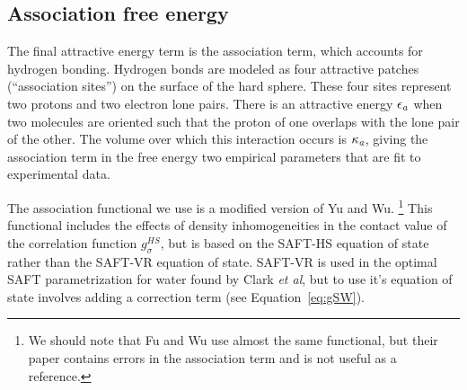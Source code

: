 \documentclass[letterpaper,twocolumn,amsmath,amssymb,prb]{revtex4-1}
\begin{document}
\subsection{Association free energy}
The final attractive energy term is the association term, which
accounts for hydrogen bonding.  Hydrogen bonds are modeled as four
attractive patches (``association sites'') on the surface of the hard
sphere.  These four sites represent two protons and two electron lone
pairs.  There is an attractive energy $\epsilon_\textit{a}$ when
two molecules are oriented such that the proton of one overlaps
with the lone pair of the other.  The volume over which this
interaction occurs is $\kappa_\textit{a}$, giving the association
term in the free energy two empirical parameters that are fit to
experimental data.

The association functional we use is a modified version of Yu
and Wu\cite{yu2002fmt-dft-inhomogeneous-associating}. \footnote{We
  should note that Fu and Wu\cite{fu2005vapor-liquid-dft} use almost
  the same functional, but their paper contains errors in the
  association term and is not useful as a reference.}
This functional includes the effects of density inhomogeneities in the
contact value of the correlation function $g^{HS}_\sigma$, but is
based on the SAFT-HS equation of state rather than the SAFT-VR
equation of state\cite{gil-villegas-1997-SAFT-VR}. SAFT-VR is used in the
optimal SAFT parametrization for water found by Clark \emph{et
  al}\cite{clark2006developing}, but to use it's
equation of state involves adding a correction term (see
Equation~\ref{eq:gSW}).
\end{document}

